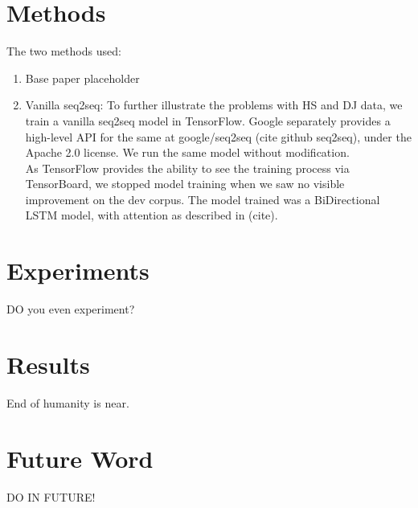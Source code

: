 \documentclass{IEEEtran}
\begin{document}
    \section{Methods}

    The two methods used:

    \begin{enumerate}
        \item Base paper placeholder
        \item Vanilla seq2seq: To further illustrate the problems with HS and DJ data, we train a 
          vanilla seq2seq model in TensorFlow. Google separately provides a high-level API for 
          the same at google/seq2seq (cite github seq2seq), under the Apache 2.0 license. 
          We run the same model without modification. \\
          As TensorFlow provides the ability to see the training process via TensorBoard, we
          stopped model training when we saw no visible improvement on the dev corpus. The model
          trained was a BiDirectional LSTM model, with attention as described in (cite).
    \end{enumerate}

    \section{Experiments}

    DO you even experiment?

    \section{Results}

    End of humanity is near.

    \section{Future Word}

    DO IN FUTURE!

    
    
\end{document}

